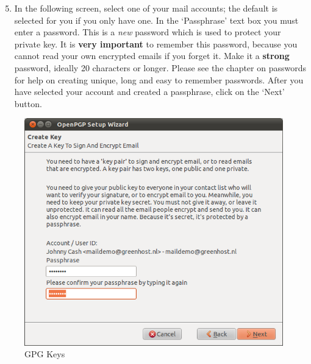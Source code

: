\begin{enumerate}[1.]
\setcounter{enumi}{4}
\item
  In the following screen, select one of your mail accounts; the default
  is selected for you if you only have one. In the `Passphrase' text box
  you must enter a password. This is a \emph{new} password which is used
  to protect your private key. It is \textbf{very important} to remember
  this password, because you cannot read your own encrypted emails if
  you forget it. Make it a \textbf{strong} password, ideally 20
  characters or longer. Please see the chapter on passwords for help on
  creating unique, long and easy to remember passwords. After you have
  selected your account and created a passphrase, click on the `Next'
  button.
\end{enumerate}
\begin{figure}[htbp]
\centering
\includegraphics{gpg_keys_5.png}
\caption{GPG Keys}
\end{figure}

